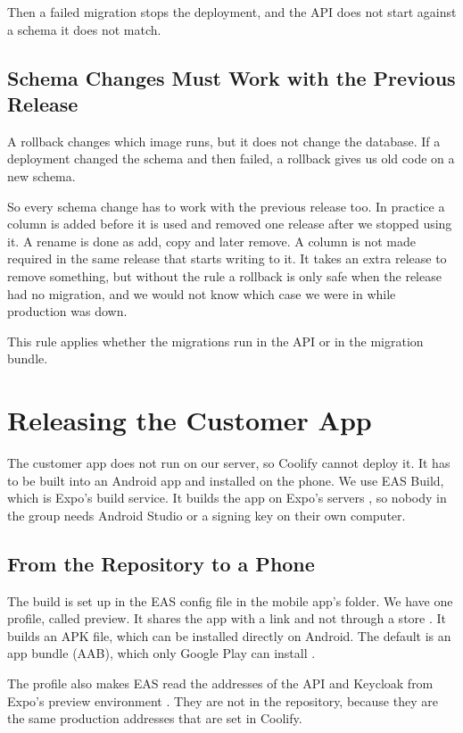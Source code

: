 \documentclass[a4paper,11pt]{article}
\begin{document}
Then a failed migration stops the deployment, and the API does not start against a schema it does not match.

\subsection*{Schema Changes Must Work with the Previous Release}
A rollback changes which image runs, but it does not change the database. If a deployment changed the schema and then failed, a rollback gives us old code on a new schema.

So every schema change has to work with the previous release too. In practice a column is added before it is used and removed one release after we stopped using it. A rename is done as add, copy and later remove. A column is not made required in the same release that starts writing to it. It takes an extra release to remove something, but without the rule a rollback is only safe when the release had no migration, and we would not know which case we were in while production was down.

This rule applies whether the migrations run in the API or in the migration bundle.

\section{Releasing the Customer App}\label{sec:customer-app}
The customer app does not run on our server, so Coolify cannot deploy it. It has to be built into an Android app and installed on the phone. We use EAS Build, which is Expo's build service. It builds the app on Expo's servers \cite{expo-eas-json}, so nobody in the group needs Android Studio or a signing key on their own computer.

\subsection{From the Repository to a Phone}
The build is set up in the EAS config file in the mobile app's folder. We have one profile, called preview. It shares the app with a link and not through a store \cite{expo-internal-distribution}. It builds an APK file, which can be installed directly on Android. The default is an app bundle (AAB), which only Google Play can install \cite{expo-eas-json}.

The profile also makes EAS read the addresses of the API and Keycloak from Expo's preview environment \cite{expo-environment-variables}. They are not in the repository, because they are the same production addresses that are set in Coolify.
\end{document}
